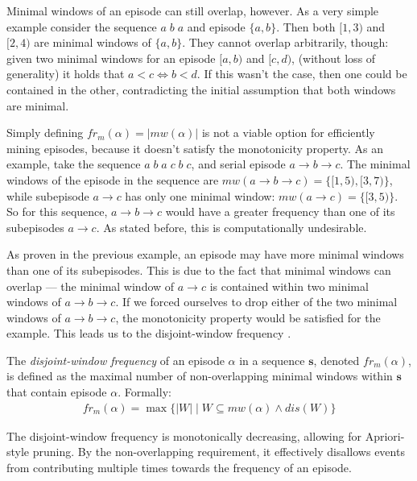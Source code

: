 Minimal windows of an episode can still overlap, however. As a very simple example consider the sequence $ a\;b\;a $ and episode $ \{ a, b \} $. Then both $ [1, 3) $ and $ [2, 4) $ are minimal windows of $ \{ a, b \} $. They cannot overlap arbitrarily, though: given two minimal windows for an episode $ [a, b) $ and $ [c, d) $, (without loss of generality) it holds that $ a < c \Leftrightarrow b < d $. If this wasn't the case, then one could be contained in the other, contradicting the initial assumption that both windows are minimal.

Simply defining $ fr_m(\alpha) = | mw(\alpha) | $ is not a viable option for efficiently mining episodes, because it doesn't satisfy the monotonicity property. As an example, take the sequence $ a\;b\;a\;c\;b\;c $, and serial episode $ a \to b \to c $. The minimal windows of the episode in the sequence are $ mw(a \to b \to c) = \{ [1, 5), [3, 7) \} $, while subepisode $ a \to c $ has only one minimal window: $ mw(a \to c) = \{ [3, 5) \} $. So for this sequence, $ a \to b \to c $ would have a greater frequency than one of its subepisodes $ a \to c $. As stated before, this is computationally undesirable.

As proven in the previous example, an episode may have more minimal windows than one of its subepisodes. This is due to the fact that minimal windows can overlap --- the minimal window of $ a \to c $ is contained within two minimal windows of $ a \to b \to c $. If we forced ourselves to drop either of the two minimal windows of $ a \to b \to c $, the monotonicity property would be satisfied for the example. This leads us to the disjoint-window frequency \citep{laxman2005discovering}.

\begin{definition}
The \emph{disjoint-window frequency} of an episode $ \alpha $ in a sequence $ \boldsymbol{s} $, denoted $ fr_m(\alpha) $, is defined as the maximal number of non-overlapping minimal windows within $ \boldsymbol{s} $ that contain episode $ \alpha $. Formally:
\begin{align*}
fr_m(\alpha) = \max\{ | W | \mid W \subseteq mw(\alpha) \wedge dis(W) \}
\end{align*}
\end{definition}

The disjoint-window frequency is monotonically decreasing, allowing for Apriori-style pruning. By the non-overlapping requirement, it effectively disallows events from contributing multiple times towards the frequency of an episode.

